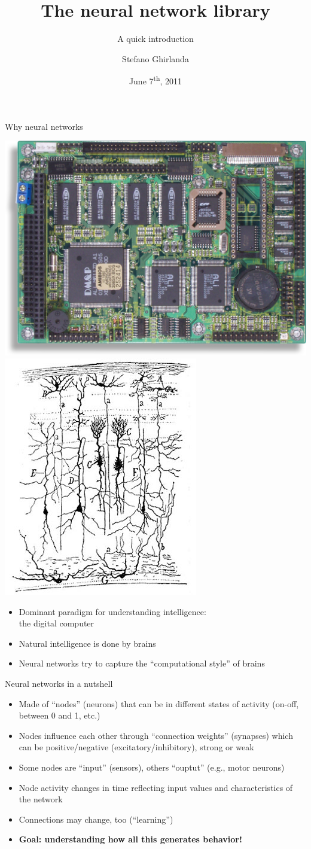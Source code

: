 \documentclass[12pt]{beamer}
\title{The \mint neural network library}
\author[S Ghirlanda]{Stefano Ghirlanda}
\subtitle{A quick introduction}
\date{June 7\textsuperscript{th}, 2011}
\begin{document}
\begin{frame}
  \titlepage
\end{frame}

\begin{frame}{Why neural networks}
  \begin{center}
    \includegraphics[width=.35\textwidth]{circuitBoard}\hspace{3ex}
    \includegraphics[width=.25\textwidth]{sparrowOpticTectum}
  \end{center}

  \begin{itemize}
  \item Dominant paradigm for understanding intelligence:\\ the
    digital computer
  \item Natural intelligence is done by brains
  \item Neural networks try to capture the ``computational style''
    of brains
  \end{itemize}

  \vfill

\end{frame}

\begin{frame}{Neural networks in a nutshell}
  \begin{itemize}
  \item<1-> Made of ``nodes'' (neurons) that can be in different
    states of activity (on-off, between 0 and 1, etc.)
  \item<1-> Nodes influence each other through ``connection weights''
    (synapses) which can be positive/negative (excitatory/inhibitory),
    strong or weak
  \item<1-> Some nodes are ``input'' (sensors), others ``ouptut'' (e.g., motor neurons)
  \item<2-> Node activity changes in time reflecting input values and characteristics of the network 
  \item<2-> Connections may change, too (``learning'')
  \item<3-> \textbf{Goal: understanding how all this generates
      behavior!}
  \end{itemize}
  
\end{frame}
\end{document}
